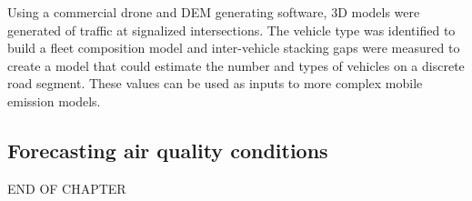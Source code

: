 Using a commercial drone and DEM generating software, 3D models were generated of traffic at signalized intersections. The vehicle type was identified to build a fleet composition model and inter-vehicle stacking gaps were measured to create a model that could estimate the number and types of vehicles on a discrete road segment. These values can be used as inputs to more complex mobile emission models.

\subsection{Forecasting air quality conditions}



%

\bigskip
\begin{center}
END OF CHAPTER
\end{center}
